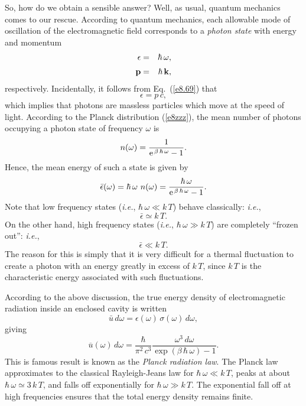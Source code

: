 So, how do we obtain a sensible answer? Well, as usual, quantum mechanics comes
to our rescue. According to quantum mechanics, 
each allowable mode of oscillation of the
electromagnetic field corresponds to a {\em photon state} with energy and
momentum
\begin{eqnarray}
\epsilon &= &\hbar\,\omega,\\[0,5ex]
{\bf p} &=& \hbar\,{\bf k},
\end{eqnarray}
respectively.
Incidentally, it follows from Eq.~(\ref{e8.69}) that
\begin{equation}
\epsilon = p\,c,
\end{equation}
which implies that photons are massless particles which move at the speed of
light.
According to the Planck distribution (\ref{e8zzz}), the mean number of
photons occupying a photon state of frequency $\omega$ is
\begin{equation}
n(\omega) = \frac{1}{{\rm e}^{\,\beta\,\hbar\,\omega}-1}.
\end{equation}
Hence, the mean energy of such a state is given by
\begin{equation}
\bar{\epsilon}(\omega) = \hbar\,\omega\,\,n(\omega) = \frac{\hbar\,\omega}{{\rm e}^{\,\beta\,\hbar\,\omega}-1}.
\end{equation}
Note that low frequency states ({\em i.e.}, $\hbar\,\omega\ll k\,T$) behave
classically: {\em i.e.},
\begin{equation}
\bar{\epsilon} \simeq k\,T.
\end{equation}
On the other hand, high frequency states ({\em i.e.}, $\hbar\,\omega\gg k\,T$)
are completely ``frozen out'': {\em  i.e.},
\begin{equation}
\bar{\epsilon} \ll k\,T.
\end{equation}
The reason for this is simply that it is very difficult for a thermal
fluctuation to create a photon with an energy greatly in excess of $k\,T$,
since $k\,T$ is the characteristic energy associated with such  fluctuations.

According to the above discussion, the true energy density of
electromagnetic radiation inside an enclosed cavity  is written
\begin{equation}
\bar{u}\,d\omega = \epsilon(\omega)\,\sigma(\omega)\,d\omega,
\end{equation}
giving
\begin{equation}
\overline{u}(\omega)\,d\omega = \frac{\hbar}{\pi^2 \,c^3} \frac{\omega^3\,d\omega}
{\exp(\beta\,\hbar\,\omega) - 1}.
\end{equation}
This is  famous
result is known as the  {\em Planck radiation law}. 
The Planck law approximates to the
classical Rayleigh-Jeans law for $\hbar\,\omega \ll k\,T$, peaks at about
$\hbar\,\omega\simeq 3\, k\,T$, and falls off exponentially for $\hbar\,\omega \gg 
k\,T$.
The exponential fall off at high frequencies ensures that the total energy density
remains finite.

